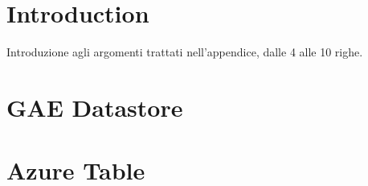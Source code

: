 \section{Introduction}
Introduzione agli argomenti trattati nell'appendice, dalle 4 alle 10 righe.

\section{GAE Datastore}
\label{appendix:datastore-config}

\section{Azure Table}
\label{appendix:table-config}
